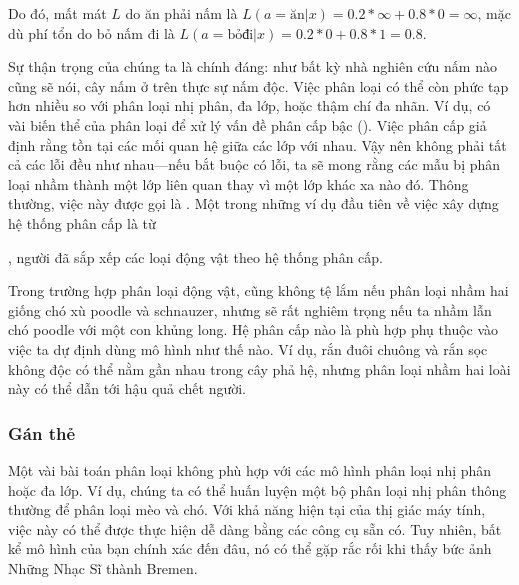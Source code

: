 \documentclass[letterpaper,11pt,english]{sphinxmanual}
\begin{document}
Do đó, mất mát \(L\) do ăn phải nấm là
\(L(a=\mathrm{ăn}| x) = 0.2 * \infty + 0.8 * 0 = \infty\), mặc dù
phí tổn do bỏ nấm đi là
\(L(a=\mathrm{bỏ đi}| x) = 0.2 * 0 + 0.8 * 1 = 0.8\).



Sự thận trọng của chúng ta là chính đáng: như bất kỳ nhà nghiên cứu nấm
nào cũng sẽ nói, cây nấm ở trên thực sự  nấm độc. Việc phân loại có
thể còn phức tạp hơn nhiều so với phân loại nhị phân, đa lớp, hoặc thậm
chí đa nhãn. Ví dụ, có vài biến thể của phân loại để xử lý vấn đề phân
cấp bậc (). Việc phân cấp giả định rằng tồn tại các mối quan
hệ giữa các lớp với nhau. Vậy nên không phải tất cả các lỗi đều như
nhau—nếu bắt buộc có lỗi, ta sẽ mong rằng các mẫu bị phân loại nhầm
thành một lớp liên quan thay vì một lớp khác xa nào đó. Thông thường,
việc này được gọi là .
Một trong những ví dụ đầu tiên về việc xây dựng hệ thống phân cấp là từ
%
\begin{footnote}[33]\sphinxAtStartFootnote
{}
%
\end{footnote}, người đã sắp
xếp các loại động vật theo hệ thống phân cấp.



Trong trường hợp phân loại động vật, cũng không tệ lắm nếu phân loại
nhầm hai giống chó xù poodle và schnauzer, nhưng sẽ rất nghiêm trọng nếu
ta nhầm lẫn chó poodle với một con khủng long. Hệ phân cấp nào là phù
hợp phụ thuộc vào việc ta dự định dùng mô hình như thế nào. Ví dụ, rắn
đuôi chuông và rắn sọc không độc có thể nằm gần nhau trong cây phả hệ,
nhưng phân loại nhầm hai loài này có thể dẫn tới hậu quả chết người.








\subsubsection{Gán thẻ}
\label{\detokenize{chapter_introduction/index_vn:gan-the}}


Một vài bài toán phân loại không phù hợp với các mô hình phân loại nhị
phân hoặc đa lớp. Ví dụ, chúng ta có thể huấn luyện một bộ phân loại nhị
phân thông thường để phân loại mèo và chó. Với khả năng hiện tại của thị
giác máy tính, việc này có thể được thực hiện dễ dàng bằng các công cụ
sẵn có. Tuy nhiên, bất kể mô hình của bạn chính xác đến đâu, nó có thể
gặp rắc rối khi thấy bức ảnh Những Nhạc Sĩ thành Bremen.
\end{document}
